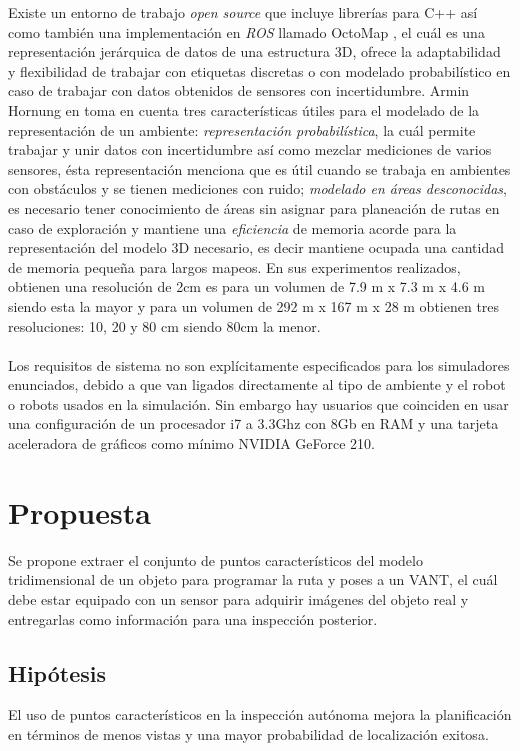 \documentclass[]{report}
\begin{document}
Existe un entorno de trabajo \textit{open source} que incluye librerías para C++ así como también una implementación en \textit{ROS} llamado OctoMap \cite{octomap}, el cuál es una representación jerárquica de datos de una estructura 3D, ofrece la adaptabilidad y flexibilidad de trabajar con etiquetas discretas  o con modelado probabilístico en caso de trabajar con datos obtenidos de sensores con incertidumbre. Armin Hornung en \cite{octomap}  toma en cuenta tres características útiles para el modelado de la representación de un ambiente: \textit{representación probabilística}, la cuál permite trabajar y unir datos con incertidumbre así como mezclar mediciones de varios sensores, ésta representación menciona que es útil cuando se trabaja en ambientes con obstáculos y se tienen mediciones con ruido; \textit{modelado en áreas desconocidas}, es necesario tener conocimiento de áreas sin asignar para planeación de rutas en caso de exploración y mantiene una \textit{eficiencia} de memoria acorde para la representación del modelo 3D necesario, es decir mantiene ocupada una cantidad de memoria pequeña para largos mapeos. En sus experimentos realizados, obtienen una resolución de 2cm es para un volumen de 7.9 m x 7.3 m x 4.6 m siendo esta la mayor y para un volumen de 292 m x 167 m x 28 m obtienen tres resoluciones: 10, 20 y 80 cm siendo 80cm la menor.\\\\

Los requisitos de sistema no son explícitamente especificados para los simuladores enunciados, debido a que van ligados directamente al tipo de ambiente y el robot  o robots usados en la simulación. Sin embargo hay usuarios que coinciden en usar una configuración de un procesador i7 a 3.3Ghz con 8Gb en RAM y una tarjeta aceleradora de gráficos como mínimo NVIDIA GeForce 210.


\chapter{Propuesta}

Se propone extraer el conjunto de puntos característicos del modelo tridimensional de un objeto para programar la ruta y poses a un VANT,  el cuál debe estar equipado con un sensor para adquirir imágenes del objeto real y entregarlas como información para una inspección posterior.

\section{Hipótesis}
 El uso de puntos característicos en la inspección autónoma mejora la planificación en términos de menos vistas y una mayor probabilidad de localización exitosa.
\end{document}
